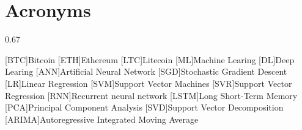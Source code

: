 \chapter*{Acronyms}

\begin{acronym}[ARIMA]
{\setlength{\baselineskip}%
{0.67\baselineskip}

[BTC]{Bitcoin}
[ETH]{Ethereum}
[LTC]{Litecoin}
[ML]{Machine Learing}
[DL]{Deep Learing}
[ANN]{Artificial Neural Network}
[SGD]{Stochastic Gradient Descent}
[LR]{Linear Regression}
[SVM]{Support Vector Machines}
[SVR]{Support Vector Regression}
[RNN]{Recurrent neural network}
[LSTM]{Long Short-Term Memory}
[PCA]{Principal Component Analysis}
[SVD]{Support Vector Decomposition}
[ARIMA]{Autoregressive Integrated Moving Average}



\par}
\end{acronym}